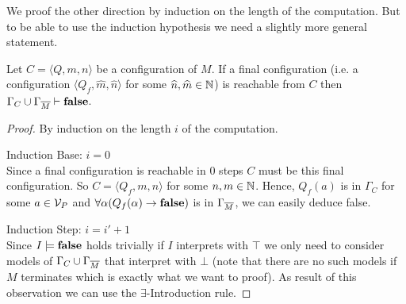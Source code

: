We proof the other direction by induction on the length of the computation. But to be able to use the induction hypothesis we need a slightly more general statement.
\begin{claim}\label{cla.18}
	Let $C=\langle Q,m,n\rangle$ be a configuration of $M$. If a final configuration (i.e. a configuration $\langle Q_f,\widehat{m},\widehat{n}\rangle$ for some $\widehat{n},\widehat{m}\in\mathbb{N}$) is reachable from $C$ then $\Gamma_C\cup\Gamma_{\overline{M}}\vdash\textbf{false}$.
\end{claim}
\begin{proof} By induction on the length $i$ of the computation.
	
	Induction Base: $i=0$\\
	Since a final configuration is reachable in 0 steps $C$ must be this final configuration. So $C=\langle Q_f,m,n\rangle$ for some $n,m\in\mathbb{N}$. Hence, $Q_f(a)$ is in $\Gamma_C$ for some $a\in\mathcal{V}_P$ and $\forall\alpha(Q_f(\alpha)\to\textbf{false})$ is in $\Gamma_{\overline{M}}$, we can easily deduce false.
	\begin{figure}[H]
		\centering
		
	\end{figure}
	 
	Induction Step: $i= i'+1$\\
	Since $I\models\textbf{false}$ holds trivially if $I$ interprets \false{} with $\top$ we only need to consider models of $\Gamma_C\cup\Gamma_{\overline{M}}$ that interpret \false{} with $\bot$ (note that there are no such models if $M$ terminates which is exactly what we want to proof). As result of this observation we can use the $\exists$-Introduction rule.
	

\end{proof}
